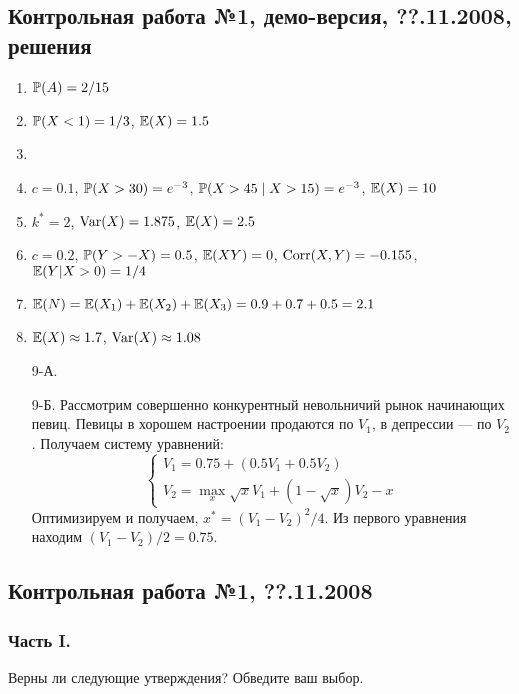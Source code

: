 \subsection{Контрольная работа №1, демо-версия, ??.11.2008, решения}
\begin{enumerate}
\item $\P(A)=2/15$
\item $\P(X<1)=1/3$, $\E(X)=1.5$
\item
\item $c=0.1$, $\P(X>30)=e^{-3}$, $\P(X>45\mid X>15)=e^{-3}$, $\E(X)=10$
\item $k^*=2$, $\Var(X)=1.875$, $\E(X)=2.5$
\item $c=0.2$, $\P(Y>-X)=0.5$, $\E(XY)=0$, $\Corr(X,Y)=-0.155$, $\E(Y|X>0)=1/4$
\item $\E(N)=\E(X_1)+\E(X_2)+\E(X_3)=0.9+0.7+0.5=2.1$
\item $\E(X)\approx 1.7$, $\Var(X)\approx 1.08$
\item[9-А.]
\item[9-Б.] Рассмотрим совершенно конкурентный невольничий рынок начинающих певиц. Певицы в хорошем настроении продаются по $V_1$, в депрессии — по $V_2$. Получаем систему уравнений:
\[
\begin{cases}
  V_1 = 0.75 + (0.5 V_1 + 0.5 V_2) \\
  V_2 = \max_x \sqrt{x}V_1 + (1 - \sqrt{x})V_2 - x
\end{cases}
\]
Оптимизируем и получаем, $x^* = (V_1 - V_2)^2/4$. Из первого уравнения находим $(V_1 - V_2)/2=0.75$.
\end{enumerate}



\subsection{Контрольная работа №1, ??.11.2008}

\subsubsection*{Часть I.}

Верны ли следующие утверждения? Обведите ваш выбор.

